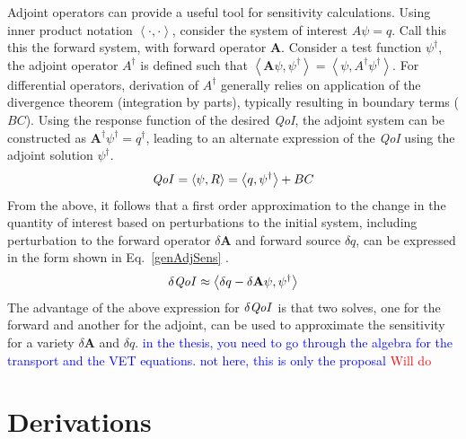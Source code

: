 \documentclass[12pt]{report}
\newcommand{\bra}{\left\langle}
\newcommand{\ket}{\right\rangle}
\newcommand{\qoi}{{\it QoI}\xspace}
\newcommand{\comment}[2]{\marginpar{\textcolor{#2}{$\star$}}\textcolor{#2}{#1}\newline}
\newcommand{\iwh}[1]{\comment{#1}{red}}
\newcommand{\jcr}[1]{\comment{#1}{blue}}
\newcommand{\iwh}[1]{\phantom{a}}
\newcommand{\jcr}[1]{\phantom{a}}
\begin{document}
Adjoint operators can provide a useful tool for sensitivity calculations. Using inner product notation $\bra \cdot , \cdot \ket$, consider the system of interest $A \psi = q$. Call this this the forward system, with forward operator $\mathbf{A}$. Consider a test function $\psi^\dag$, the adjoint operator $A^\dag$ is defined such that $\bra \mathbf{A} \psi, \psi^\dag \ket = \bra \psi, A^\dag \psi^\dag \ket $. For differential operators, derivation of $A^\dag$ generally relies on application of the divergence theorem (integration by parts), typically resulting in boundary terms ($BC$). Using the response function of the desired \qoi, the adjoint system can be constructed as $\mathbf{A^\dag} \psi^\dag = q^\dag$, leading to an alternate expression of the \qoi using the adjoint solution $\psi^\dag $.
\begin{equation}
\label{genAdjQoI}
\qoi = \bra \psi, R \ket = \bra q , \psi^\dag \ket + BC
\end{equation} 
From the above, it follows that a first order approximation to the change in the quantity of interest based on perturbations to the initial system, including perturbation to the forward operator $\delta \mathbf{A}$ and forward source $\delta q$, can be expressed in the form shown in Eq.~\eqref{genAdjSens} \cite{Marchuk}.
\begin{equation}
\label{genAdjSens}
\delta \qoi \approx \bra \delta q - \delta \mathbf{A} \psi , \psi^\dag \ket 
\end{equation}
The advantage of the above expression for $\delta \qoi$ is that two solves, one for the forward and another for the adjoint, can be used to approximate the sensitivity for a variety $\delta \mathbf{A}$ and $\delta q$.
\jcr{in the thesis, you need to go through the algebra for the transport and the VET equations. not here, this is only the proposal}
\iwh{Will do}
 
%
%
%
%



\chapter{Derivations}
\end{document}

